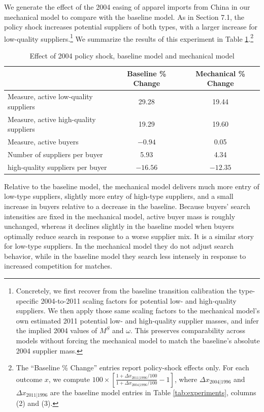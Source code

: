 \documentclass[12pt]{article} \usepackage{amsmath,amssymb,amsthm,geometry,graphicx,setspace,algorithm,algpseudocode,float}
\begin{document}
We generate the effect of the 2004 easing of apparel imports from China in our mechanical model to compare with the baseline model.  As in Section 7.1, the policy shock increases potential suppliers of both types, with a larger increase for low-quality suppliers.\footnote{Concretely, we first recover from the baseline transition calibration the type-specific 2004-to-2011 scaling factors for potential low- and high-quality suppliers. We then apply those same scaling factors to the mechanical model's own estimated 2011 potential low- and high-quality supplier masses, and infer the implied 2004 values of \(M^S\) and \(\omega\). This preserves comparability across models without forcing the mechanical model to match the baseline's absolute 2004 supplier mass.\medskip}  We summarize the results of this experiment in Table \ref{tab:mech_vs_base}.\footnote{The ``Baseline \% Change'' entries report policy-shock effects only. For each outcome \(x\), we compute \(100\times\left[\frac{1+\Delta x_{2011|1996}/100}{1+\Delta x_{2004|1996}/100}-1\right]\), where \(\Delta x_{2004|1996}\) and \(\Delta x_{2011|1996}\) are the baseline model entries in Table \ref{tab:experiments}, columns (2) and (3).\medskip}
\begin{table}[h!]\centering
\caption{Effect of 2004 policy shock, baseline model and mechanical model}
\label{tab:mech_vs_base}
\begin{tabular}{lcc}
\toprule
 & Baseline \% Change & Mechanical \% Change \\
\midrule
Measure, active low-quality suppliers & 29.28 & 19.44 \\
Measure, active high-quality suppliers & 19.29 & 19.60 \\
Measure, active buyers & $-0.94$ & 0.05 \\
Number of suppliers per buyer & 5.93 & 4.34 \\
high-quality suppliers per buyer & $-16.56$ & $-12.35$ \\
\bottomrule
\end{tabular}
\end{table}
Relative to the baseline model, the mechanical model delivers much more entry of low-type suppliers, slightly more entry of high-type suppliers, and a small increase in buyers relative to a decrease in the baseline.  Because buyers' search intensities are fixed in the mechanical model, active buyer mass is roughly unchanged, whereas it declines slightly in the baseline model when buyers optimally reduce search in response to a worse supplier mix.  It is a similar story for low-type suppliers.  In the mechanical model they do not adjust search behavior, while in the baseline model they search less intensely in response to increased competition for matches.
\end{document}
